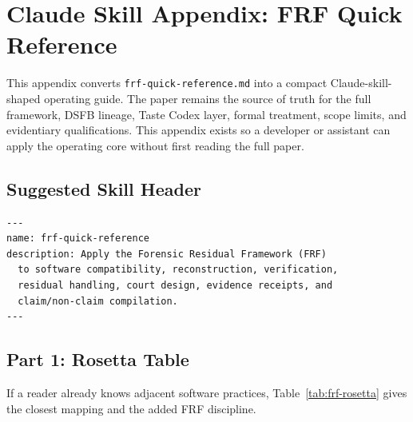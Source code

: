 \documentclass[11pt,a4paper]{article}
\newcommand{\frf}{\textsc{FRF}}
\begin{document}
\clearpage
\section{Claude Skill Appendix: FRF Quick Reference}
\label{app:claude-skill}

This appendix converts \texttt{frf-quick-reference.md} into a compact Claude-skill-shaped operating guide. The paper remains the source of truth for the full framework, DSFB lineage, Taste Codex layer, formal treatment, scope limits, and evidentiary qualifications. This appendix exists so a developer or assistant can apply the operating core without first reading the full paper.

\subsection{Suggested Skill Header}

\begin{verbatim}
---
name: frf-quick-reference
description: Apply the Forensic Residual Framework (FRF)
  to software compatibility, reconstruction, verification,
  residual handling, court design, evidence receipts, and
  claim/non-claim compilation.
---
\end{verbatim}

\subsection{Part 1: Rosetta Table}

If a reader already knows adjacent software practices, Table~\ref{tab:frf-rosetta} gives the closest mapping and the added \frf{} discipline.
\end{document}
